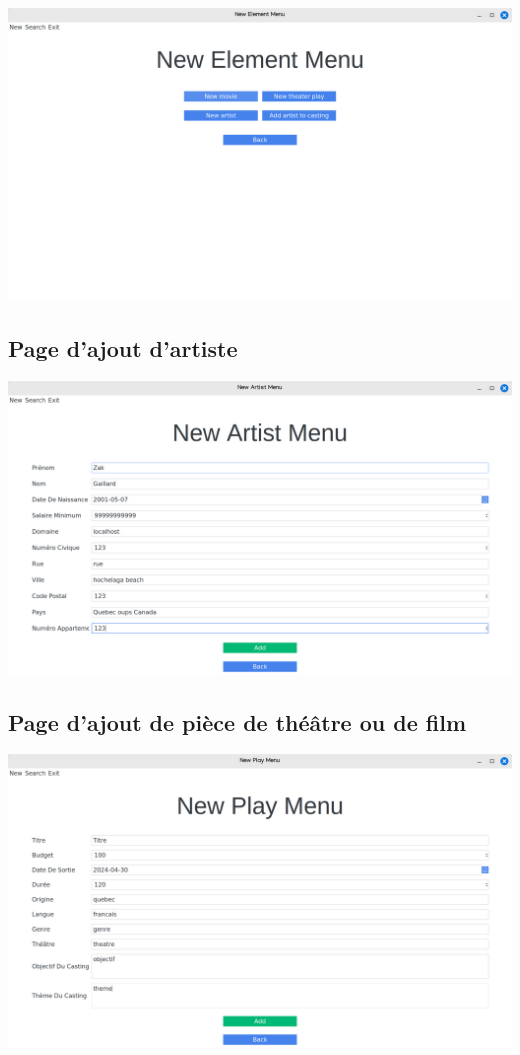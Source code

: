\documentclass{article}
\begin{document}
\begin{center}
 \includegraphics[scale=0.16]{add.png}
\end{center}

\subsection{Page d'ajout d'artiste}

\begin{center}
  \includegraphics[scale=0.16]{addartist.png}
\end{center}

\subsection{Page d'ajout de pièce de théâtre ou de film}

\begin{center}
  \includegraphics[scale=0.16]{addplay.png}
\end{center}
\end{document}
